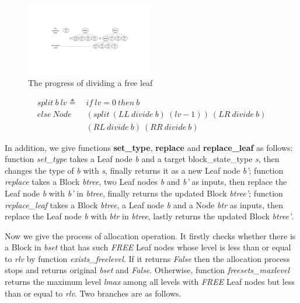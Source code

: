 \begin{figure}[htbp]
	\centering
	\includegraphics[width=0.5\textwidth]{fig1.pdf}
	\caption{The progress of dividing a free leaf}
	\label{fig1}
\end{figure}

\begin{definition} 
\end{definition}
\vspace{-7pt}
{\footnotesize
\begin{align*}
split\ b\ lv \triangleq\ &if\ lv = 0\ then\ b \\
else\ Node\ &(split\ (LL\ divide\ b)\ (lv - 1))\ (LR\ divide\ b)\\ 
&(RL\ divide\ b)\ (RR\ divide\ b)
\end{align*}
}	
\vspace{-12pt}

In addition, we give functions \textbf{set\_type}, \textbf{replace} and \textbf{replace\_leaf} as follows: function \emph{set\_type} takes a Leaf node \emph{b} and a target block\_state\_type \emph{s}, then changes the type of \emph{b} with \emph{s}, finally returns it as a new Leaf node \emph{b'}; function \emph{replace} takes a Block \emph{btree}, two Leaf nodes \emph{b} and \emph{b'} as inputs, then replace the Leaf node \emph{b} with \emph{b'} in \emph{btree}, finally returns the updated Block \emph{btree'}; function \emph{replace\_leaf} takes a Block \emph{btree}, a Leaf node \emph{b} and a Node \emph{btr} as inputs, then replace the Leaf node \emph{b} with \emph{btr} in \emph{btree}, lastly returns the updated Block \emph{btree'}.

Now we give the process of allocation operation. It firstly checks whether there is a Block in \emph{bset} that has such \emph{FREE} Leaf nodes whose level is less than or equal to \emph{rlv} by function \emph{exists\_freelevel}. If it returns \emph{False} then the allocation process stops and returns original \emph{bset} and \emph{False}. Otherwise, function \emph{freesets\_maxlevel} returns the maximum level \emph{lmax} among all levels with \emph{FREE} Leaf nodes but less than or equal to \emph{rlv}. Two branches are as follows.

